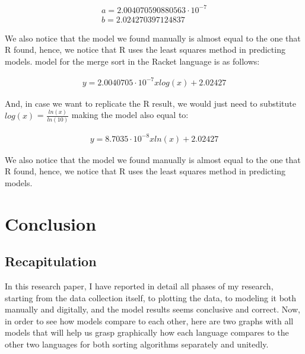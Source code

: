 \documentclass[]{report}
\begin{document}
		 		\begin{equation}
		 			\begin{align}
						a = 2.004070590880563\cdot10^{-7}\\
						b = 2.024270397124837
		 			\end{align}
				\end{equation}
				
				We also notice that the model we found manually is almost equal to the one that R found, hence, we notice that R uses the least squares method in predicting models. model for the merge sort in the Racket language is as follows:
				
				\begin{ceqn}
					\begin{align}
		 				y = 2.0040705\cdot10^{-7}xlog(x) + 2.02427
					\end{align}
				\end{ceqn}
				And, in case we want to replicate the R result, we would just need to substitute $log(x)$ = $\frac{ln(x)}{ln(10)}$ making the model also equal to:
				\begin{ceqn}
					\begin{align}
		 				y = 8.7035\cdot10^{-8}xln(x) + 2.02427
					\end{align}
				\end{ceqn}
				
				We also notice that the model we found manually is almost equal to the one that R found, hence, we notice that R uses the least squares method in predicting models.
		 		
		 		


		\chapter{Conclusion}
		
		\section{Recapitulation}
		In this research paper, I have reported in detail all phases of my research, starting from the data collection itself, to plotting the data, to modeling it both manually and digitally, and the model results seems conclusive and correct. Now, in order to see how models compare to each other, here are two graphs with all models that will help us grasp graphically how each language compares to the other two languages for both sorting algorithms separately and unitedly.
		
\end{document}
